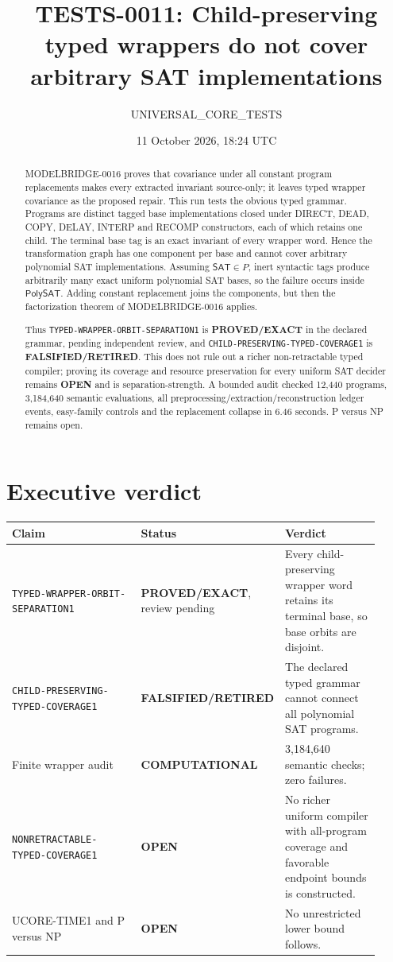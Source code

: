 \documentclass[11pt]{article}
\title{TESTS-0011: Child-preserving typed wrappers do not cover arbitrary SAT implementations}
\author{UNIVERSAL\_CORE\_TESTS}
\date{11 October 2026, 18:24 UTC}
\newcommand{\SAT}{\mathsf{SAT}}
\newcommand{\PolySAT}{\mathsf{PolySAT}}
\newcommand{\EXACT}{\textbf{PROVED/EXACT}}
\newcommand{\OPEN}{\textbf{OPEN}}
\newcommand{\RETIRED}{\textbf{FALSIFIED/RETIRED}}
\newcommand{\COMP}{\textbf{COMPUTATIONAL}}
\begin{document}
\maketitle

\begin{abstract}
MODELBRIDGE-0016 proves that covariance under all constant program
replacements makes every extracted invariant source-only; it leaves typed
wrapper covariance as the proposed repair.  This run tests the obvious typed
grammar.  Programs are distinct tagged base implementations closed under
DIRECT, DEAD, COPY, DELAY, INTERP and RECOMP constructors, each of which
retains one child.  The terminal base tag is an exact invariant of every
wrapper word.  Hence the transformation graph has one component per base and
cannot cover arbitrary polynomial SAT implementations.  Assuming
\(\SAT\in P\), inert syntactic tags produce arbitrarily many exact uniform
polynomial SAT bases, so the failure occurs inside \(\PolySAT\).  Adding
constant replacement joins the components, but then the factorization
theorem of MODELBRIDGE-0016 applies.

Thus \texttt{TYPED-WRAPPER-ORBIT-SEPARATION1} is \EXACT{} in the declared
grammar, pending independent review, and
\texttt{CHILD-PRESERVING-TYPED-COVERAGE1} is \RETIRED.  This does not rule
out a richer non-retractable typed compiler; proving its coverage and
resource preservation for every uniform SAT decider remains \OPEN{} and is
separation-strength.  A bounded audit checked 12,440 programs, 3,184,640
semantic evaluations, all preprocessing/extraction/reconstruction ledger
events, easy-family controls and the replacement collapse in 6.46 seconds.
P versus NP remains open.
\end{abstract}

\section{Executive verdict}
\begin{center}\small
\begin{tabular}{@{}p{0.42\linewidth}p{0.19\linewidth}p{0.31\linewidth}@{}}
\toprule
Claim & Status & Verdict\\ \midrule
\texttt{TYPED-WRAPPER-ORBIT-SEPARATION1} & \EXACT, review pending &
Every child-preserving wrapper word retains its terminal base, so base orbits
are disjoint.\\
\texttt{CHILD-PRESERVING-TYPED-COVERAGE1} & \RETIRED &
The declared typed grammar cannot connect all polynomial SAT programs.\\
Finite wrapper audit & \COMP & 3,184,640 semantic checks; zero failures.\\
\texttt{NONRETRACTABLE-TYPED-COVERAGE1} & \OPEN &
No richer uniform compiler with all-program coverage and favorable endpoint
bounds is constructed.\\
UCORE-TIME1 and P versus NP & \OPEN & No unrestricted lower bound follows.\\
\bottomrule
\end{tabular}
\end{center}
\end{document}
